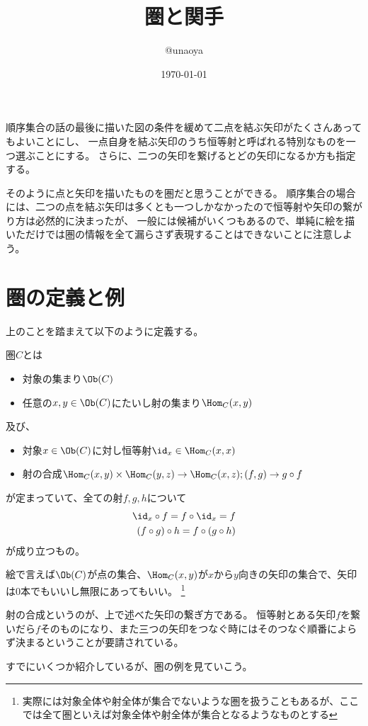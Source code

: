 \documentclass[uplatex]{jsarticle}
\title{圏と関手}
\author{@unaoya}
\date{\today}
\begin{document}
\maketitle
順序集合の話の最後に描いた図の条件を緩めて二点を結ぶ矢印がたくさんあってもよいことにし、
一点自身を結ぶ矢印のうち恒等射と呼ばれる特別なものを一つ選ぶことにする。
さらに、二つの矢印を繋げるとどの矢印になるか方も指定する。

そのように点と矢印を描いたものを圏だと思うことができる。
順序集合の場合には、二つの点を結ぶ矢印は多くとも一つしかなかったので恒等射や矢印の繋がり方は必然的に決まったが、
一般には候補がいくつもあるので、単純に絵を描いただけでは圏の情報を全て漏らさず表現することはできないことに注意しよう。

\section{圏の定義と例}
上のことを踏まえて以下のように定義する。
\begin{dfn}[圏]
圏$C$とは
\begin{itemize}
\item 対象の集まり$\Ob(C)$
\item 任意の$x, y\in \Ob(C)$にたいし射の集まり$\Hom_C(x,y)$
\end{itemize}
及び、
\begin{itemize}
\item 対象$x\in \Ob(C)$に対し恒等射$\id_x\in\Hom_C(x,x)$
\item 射の合成$\Hom_C(x,y)\times\Hom_C(y,z)\to \Hom_C(x,z); (f,g)\to g\circ f$
\end{itemize}
が定まっていて、全ての射$f, g, h$について
\begin{align*}
\id_x\circ f=f\circ \id_x=f\\
(f\circ g)\circ h=f\circ(g\circ h)
\end{align*}
が成り立つもの。
\end{dfn}
絵で言えば$\Ob(C)$が点の集合、$\Hom_C(x,y)$が$x$から$y$向きの矢印の集合で、矢印は$0$本でもいいし無限にあってもいい。
\footnote{実際には対象全体や射全体が集合でないような圏を扱うこともあるが、ここでは全て圏といえば対象全体や射全体が集合となるようなものとする} 

射の合成というのが、上で述べた矢印の繋ぎ方である。
恒等射とある矢印$f$を繋いだら$f$そのものになり、また三つの矢印をつなぐ時にはそのつなぐ順番によらず決まるということが要請されている。

すでにいくつか紹介しているが、圏の例を見ていこう。
\end{document}
